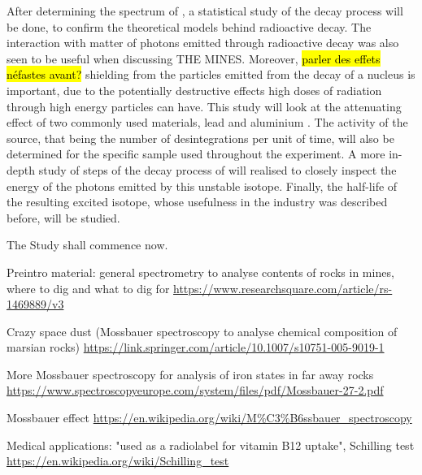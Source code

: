 After determining the spectrum of \cobalt, a statistical study of the decay process will be done, to confirm the theoretical models behind radioactive decay. The interaction with matter of photons emitted through radioactive decay was also seen to be useful when discussing THE MINES. Moreover, \hl{parler des effets néfastes avant?} shielding from the particles emitted from the decay of a nucleus is important, due to the potentially destructive effects high doses of radiation through high energy particles can have. This study will look at the attenuating effect of two commonly used materials, lead and aluminium \cite{my_ass}. The activity of the source, that being the number of desintegrations per unit of time, will also be determined for the specific \cobalt sample used throughout the experiment. A more in-depth study of steps of the decay process of \cobalt will realised to closely inspect the energy of the photons emitted by this unstable isotope. Finally, the half-life of the resulting excited \iron isotope, whose usefulness in the industry was described before, will be studied.

The Study shall commence now.

Preintro material: general spectrometry to analyse contents of rocks in mines, where to dig and what to dig for \url{https://www.researchsquare.com/article/rs-1469889/v3} \cite{ramadhany_assessment_2022}

Crazy space dust (Mossbauer spectroscopy to analyse chemical composition of marsian rocks) \url{https://link.springer.com/article/10.1007/s10751-005-9019-1}

More Mossbauer spectroscopy for analysis of iron states in far away rocks \url{https://www.spectroscopyeurope.com/system/files/pdf/Mossbauer-27-2.pdf}

Mossbauer effect \url{https://en.wikipedia.org/wiki/M%C3%B6ssbauer_spectroscopy}

Medical applications: "used as a radiolabel for vitamin B12 uptake", Schilling test \url{https://en.wikipedia.org/wiki/Schilling_test}